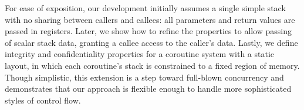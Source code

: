 \documentclass[acmsmall,review,anonymous]{acmart}\settopmatter{printfolios=true,printccs=false,printacmref=false}
\begin{document}

For ease of exposition, our development initially assumes a single simple
stack with no sharing between callers and callees: all parameters and return
values are passed in registers.  Later, we show how to refine the properties
to allow passing of scalar stack data, granting a callee access to the
caller's data.
%
Lastly, we define integrity and confidentiality properties for a coroutine
system with a static layout, in which each coroutine's stack is constrained
to a fixed region of memory.  Though simplistic, this extension is a step
toward full-blown concurrency and demonstrates that our approach is flexible
enough to handle more sophisticated styles of control flow.



\end{document}
